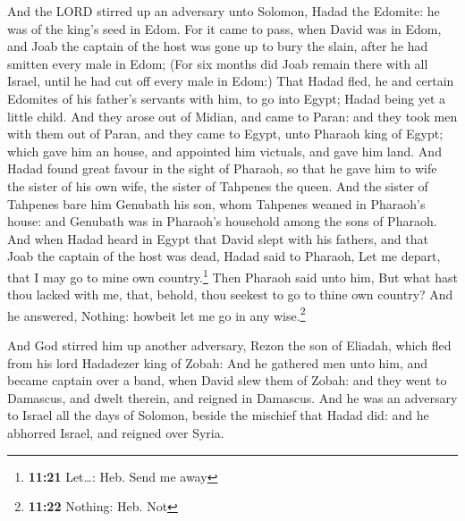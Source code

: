  And the LORD stirred up an adversary unto Solomon, Hadad
the Edomite: he was of the king's seed in Edom.  For it
came to pass, when David was in Edom, and Joab the captain of the host
was gone up to bury the slain, after he had smitten every male in Edom;
 (For six months did Joab remain there with all Israel,
until he had cut off every male in Edom:)  That Hadad
fled, he and certain Edomites of his father's servants with him, to go
into Egypt; Hadad being yet a little child.  And they
arose out of Midian, and came to Paran: and they took men with them out
of Paran, and they came to Egypt, unto Pharaoh king of Egypt; which gave
him an house, and appointed him victuals, and gave him land.
 And Hadad found great favour in the sight of Pharaoh, so
that he gave him to wife the sister of his own wife, the sister of
Tahpenes the queen.  And the sister of Tahpenes bare him
Genubath his son, whom Tahpenes weaned in Pharaoh's house: and Genubath
was in Pharaoh's household among the sons of Pharaoh. 
And when Hadad heard in Egypt that David slept with his fathers, and
that Joab the captain of the host was dead, Hadad said to Pharaoh, Let
me depart, that I may go to mine own country.\footnote{\textbf{11:21}
  Let\ldots: Heb. Send me away}  Then Pharaoh said unto
him, But what hast thou lacked with me, that, behold, thou seekest to go
to thine own country? And he answered, Nothing: howbeit let me go in any
wise.\footnote{\textbf{11:22} Nothing: Heb. Not}

 And God stirred him up another adversary, Rezon the son
of Eliadah, which fled from his lord Hadadezer king of Zobah:
 And he gathered men unto him, and became captain over a
band, when David slew them of Zobah: and they went to Damascus, and
dwelt therein, and reigned in Damascus.  And he was an
adversary to Israel all the days of Solomon, beside the mischief that
Hadad did: and he abhorred Israel, and reigned over Syria.

